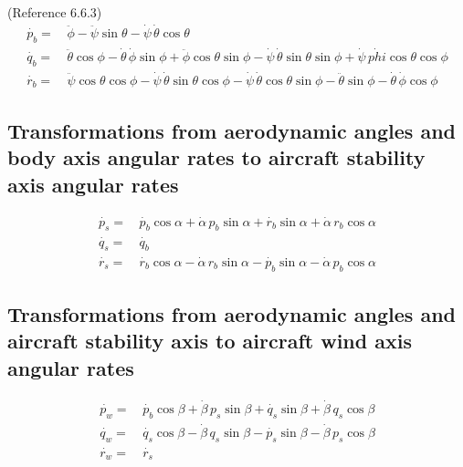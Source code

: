 \documentclass[
]{book}
\begin{document}
(Reference 6.6.3)
\[
\begin{align}
\dot{p_b} =& \, \ddot{\phi} - \ddot{\psi}\sin\theta - \dot{\psi} \, \dot{\theta} \cos\theta  \\
\dot{q_b} =& \, \ddot{\theta} \cos\phi - \dot{\theta} \, \dot{\phi} \sin{\phi} + \ddot{\phi} \cos\theta \sin\phi - \dot{\psi} \, \dot{\theta} \sin\theta \sin\phi + \dot{\psi} \, \dot{phi} \cos\theta \cos\phi \\
\dot{r_b} =& \, \ddot{\psi} \cos\theta \cos\phi - \dot{\psi} \, \dot{\theta} \sin\theta \cos\phi - \dot{\psi} \, \dot{\theta} \cos\theta \sin\phi - \ddot{\theta} \sin\phi - \dot{\theta} \, \dot{\phi} \cos\phi
\end{align}
\]

\hypertarget{transformations-from-aerodynamic-angles-and-body-axis-angular-rates-to-aircraft-stability-axis-angular-rates}{%
\subsection{Transformations from aerodynamic angles and body axis angular rates to aircraft stability axis angular rates}\label{transformations-from-aerodynamic-angles-and-body-axis-angular-rates-to-aircraft-stability-axis-angular-rates}}

\[
\begin{align}
\dot{p_s} =& \, \dot{p_b} \cos\alpha + \dot{\alpha} \, p_b \sin\alpha + \dot{r_b}\sin\alpha + \dot{\alpha} \, r_b \cos\alpha  \\
\dot{q_s} =& \, \dot{q_b} \\
\dot{r_s} =& \, \dot{r_b} \cos\alpha - \dot{\alpha} \, r_b \sin\alpha - \dot{p_b}\sin\alpha - \dot{\alpha} \, p_b \cos\alpha
\end{align}
\]

\hypertarget{transformations-from-aerodynamic-angles-and-aircraft-stability-axis-to-aircraft-wind-axis-angular-rates}{%
\subsection{Transformations from aerodynamic angles and aircraft stability axis to aircraft wind axis angular rates}\label{transformations-from-aerodynamic-angles-and-aircraft-stability-axis-to-aircraft-wind-axis-angular-rates}}

\[
\begin{align}
\dot{p_w} =& \, \dot{p_b} \cos\beta + \dot{\beta} \, p_s \sin\beta + \dot{q_s}\sin\beta + \dot{\beta} \, q_s \cos\beta  \\
\dot{q_w} =& \,  \dot{q_s} \cos\beta - \dot{\beta} \, q_s \sin\beta - \dot{p_s} \sin\beta - \dot{\beta} \, p_s \cos\beta\\
\dot{r_w} =& \, \dot{r_s}
\end{align}
\]
\end{document}

